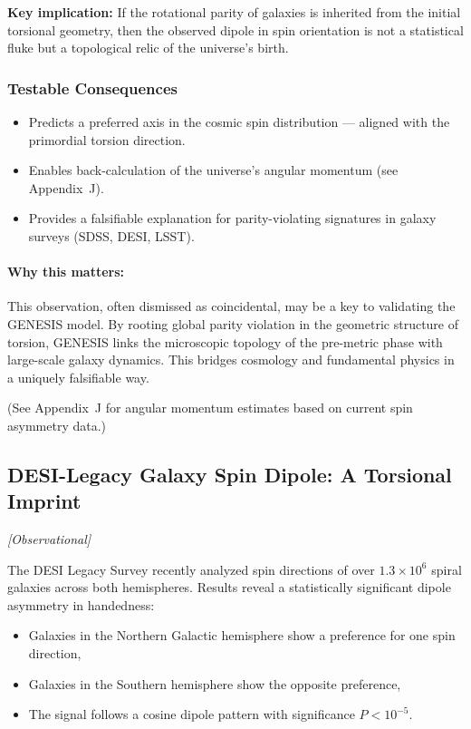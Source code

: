 \documentclass{article}
\newcommand{\obstag}{\textcolor{green!60!black}{\textit{[Observational]}}}
\begin{document}
\textbf{Key implication:} If the rotational parity of galaxies is inherited from the initial torsional geometry, then the observed dipole in spin orientation is not a statistical fluke but a topological relic of the universe's birth.

\subsubsection*{Testable Consequences}
\begin{itemize}
  \item Predicts a preferred axis in the cosmic spin distribution --- aligned with the primordial torsion direction.
  \item Enables back-calculation of the universe’s angular momentum (see Appendix~J).
  \item Provides a falsifiable explanation for parity-violating signatures in galaxy surveys (SDSS, DESI, LSST).
\end{itemize}


\begin{tcolorbox}[colback=gray!5, colframe=black!30, title=Why this matters]

\paragraph{Why this matters:}
This observation, often dismissed as coincidental, may be a key to validating the GENESIS model. By rooting global parity violation in the geometric structure of torsion, GENESIS links the microscopic topology of the pre-metric phase with large-scale galaxy dynamics. This bridges cosmology and fundamental physics in a uniquely falsifiable way.
\end{tcolorbox}

(See Appendix~J for angular momentum estimates based on current spin asymmetry data.)


\subsection{ DESI-Legacy Galaxy Spin Dipole: A Torsional Imprint}
\label{sec:desi_spin_dipole}
\obstag

The DESI Legacy Survey recently analyzed spin directions of over $1.3 \times 10^6$ spiral galaxies across both hemispheres. Results reveal a statistically significant dipole asymmetry in handedness:
\begin{itemize}
  \item Galaxies in the Northern Galactic hemisphere show a preference for one spin direction,
  \item Galaxies in the Southern hemisphere show the opposite preference,
  \item The signal follows a cosine dipole pattern with significance $P < 10^{-5}$.
\end{itemize}
\end{document}

